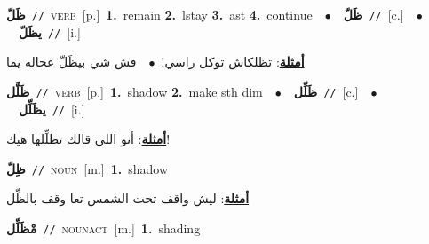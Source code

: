\documentclass[10pt,a4paper,twoside]{article} %
\begin{document}
\begin{multicols}{2}
{\setlength\topsep{0pt}\textbf{\foreignlanguage{arabic}{ظَلّ}}\ {\color{gray}\texttt{//}\color{black}}\ \textsc{verb}\ [p.]\ \textbf{1.}~remain  \textbf{2.}~lstay  \textbf{3.}~ast  \textbf{4.}~continue\ \ $\bullet$\ \ \setlength\topsep{0pt}\textbf{\foreignlanguage{arabic}{ظَلّ}}\ {\color{gray}\texttt{//}\color{black}}\ [c.]\ \ $\bullet$\ \ \setlength\topsep{0pt}\textbf{\foreignlanguage{arabic}{يظَلّ}}\ {\color{gray}\texttt{//}\color{black}}\ [i.]\  \begin{flushright}\color{gray}\foreignlanguage{arabic}{\textbf{\underline{\foreignlanguage{arabic}{أمثلة}}}: تظلكاش توكل راسي!\ $\bullet$\ \  فش شي بيظَلّ عحاله يما}\end{flushright}\color{black}} \vspace{2mm}

{\setlength\topsep{0pt}\textbf{\foreignlanguage{arabic}{ظَلَّل}}\ {\color{gray}\texttt{//}\color{black}}\ \textsc{verb}\ [p.]\ \textbf{1.}~shadow  \textbf{2.}~make sth dim\ \ $\bullet$\ \ \setlength\topsep{0pt}\textbf{\foreignlanguage{arabic}{ظَلِّل}}\ {\color{gray}\texttt{//}\color{black}}\ [c.]\ \ $\bullet$\ \ \setlength\topsep{0pt}\textbf{\foreignlanguage{arabic}{يظَلِّل}}\ {\color{gray}\texttt{//}\color{black}}\ [i.]\  \begin{flushright}\color{gray}\foreignlanguage{arabic}{\textbf{\underline{\foreignlanguage{arabic}{أمثلة}}}: أنو اللي قالك تظلِّلها هيك!}\end{flushright}\color{black}} \vspace{2mm}

{\setlength\topsep{0pt}\textbf{\foreignlanguage{arabic}{ظِلّ}}\ {\color{gray}\texttt{//}\color{black}}\ \textsc{noun}\ [m.]\ \textbf{1.}~shadow\  \begin{flushright}\color{gray}\foreignlanguage{arabic}{\textbf{\underline{\foreignlanguage{arabic}{أمثلة}}}: ليش واقف تحت الشمس تعا وقف بالظِّل}\end{flushright}\color{black}} \vspace{2mm}

{\setlength\topsep{0pt}\textbf{\foreignlanguage{arabic}{مْظَلِّل}}\ {\color{gray}\texttt{//}\color{black}}\ \textsc{noun\textunderscore act}\ [m.]\ \textbf{1.}~shading\ } \vspace{2mm}


\end{multicols}
\end{document}
